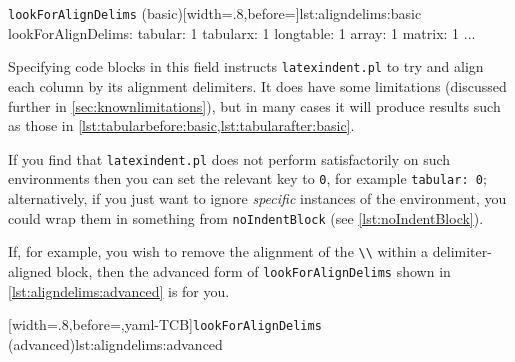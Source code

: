 	\begin{yaml}[numbers=none]{\texttt{lookForAlignDelims} (basic)}[width=.8\linewidth,before=\centering]{lst:aligndelims:basic}
lookForAlignDelims:
   tabular: 1
   tabularx: 1
   longtable: 1
   array: 1
   matrix: 1
   ...
	\end{yaml}

	Specifying code blocks in this field instructs \texttt{latexindent.pl} to try and align
	each column by its alignment delimiters. It does have some limitations (discussed further
	in \cref{sec:knownlimitations}), but in many cases it will produce results such as those
	in \cref{lst:tabularbefore:basic,lst:tabularafter:basic}.

	If you find that \texttt{latexindent.pl} does not perform satisfactorily on such
	environments then you can set the relevant key to \texttt{0}, for example
	\texttt{tabular: 0}; alternatively, if you just want to ignore \emph{specific} instances
	of the environment, you could wrap them in something from \texttt{noIndentBlock} (see
	\vref{lst:noIndentBlock}).

	\begin{cmhtcbraster}
	\end{cmhtcbraster}

	If, for example, you wish to remove the alignment of the \lstinline!\\! within a
	delimiter-aligned block, then the advanced form of \texttt{lookForAlignDelims} shown in
	\cref{lst:aligndelims:advanced} is for you.

	[width=.8\linewidth,before=\centering,yaml-TCB]{\texttt{lookForAlignDelims} (advanced)}{lst:aligndelims:advanced}

